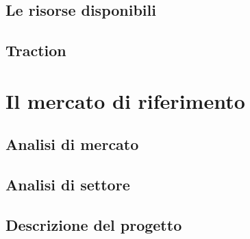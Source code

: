 \subsection{Le risorse disponibili}

\subsection{Traction}

\clearpage

\section{Il mercato di riferimento}\label{sec:whattheproblemis}
\subsection{Analisi di mercato}

\subsection{Analisi di settore}

\subsection{Descrizione del progetto}

\clearpage

